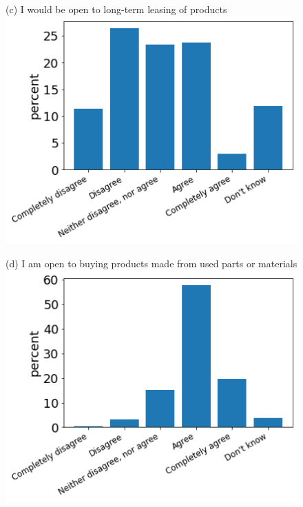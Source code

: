 \documentclass[12pt]{article}
\begin{document}
\begin{figure}[h!!]
\begin{minipage}[h!!]{0.32\textwidth}
	\end{minipage}
	\begin{minipage}[h!!]{0.32\textwidth}  
		\centering\footnotesize{(c) I would be open to long-term leasing of products}
		\includegraphics[width=1\textwidth]{../codding_data/results/liss/qk20a141title0.png}
	\end{minipage}	
	\begin{minipage}[h!!]{0.32\textwidth}  
		\centering\footnotesize{(d) I am open to buying products made from used parts or materials}
		\includegraphics[width=1\textwidth]{../codding_data/results/liss/qk20a147title0.png}

\end{minipage}
\end{figure}
\end{document}
